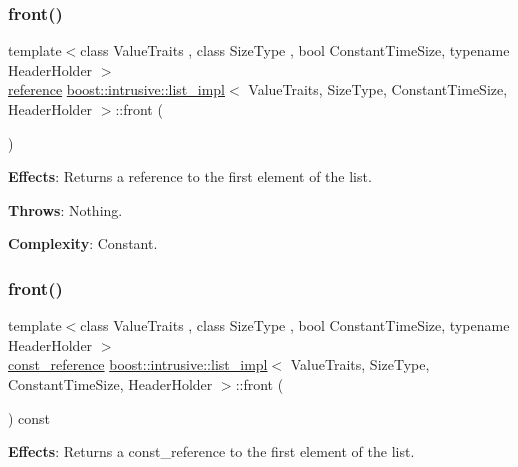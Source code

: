\subsubsection{\texorpdfstring{front()}{front()}\hspace{0.1cm}{\footnotesize\ttfamily [1/2]}}
{\footnotesize\ttfamily template$<$class Value\+Traits , class Size\+Type , bool Constant\+Time\+Size, typename Header\+Holder $>$ \\
\hyperlink{classboost_1_1intrusive_1_1list__impl_a881763b587dbe7c0237a552a9e89755a}{reference} \hyperlink{classboost_1_1intrusive_1_1list__impl}{boost\+::intrusive\+::list\+\_\+impl}$<$ Value\+Traits, Size\+Type, Constant\+Time\+Size, Header\+Holder $>$\+::front (\begin{DoxyParamCaption}{ }\end{DoxyParamCaption})\hspace{0.3cm}{\ttfamily [inline]}}

{\bfseries Effects}\+: Returns a reference to the first element of the list.

{\bfseries Throws}\+: Nothing.

{\bfseries Complexity}\+: Constant. \mbox{\label{classboost_1_1intrusive_1_1list__impl_a51eb323fe6d3cc6c590886a7514dbb27}} 
\subsubsection{\texorpdfstring{front()}{front()}\hspace{0.1cm}{\footnotesize\ttfamily [2/2]}}
{\footnotesize\ttfamily template$<$class Value\+Traits , class Size\+Type , bool Constant\+Time\+Size, typename Header\+Holder $>$ \\
\hyperlink{classboost_1_1intrusive_1_1list__impl_a3d37629151c76fb8389ac3ba3b359201}{const\+\_\+reference} \hyperlink{classboost_1_1intrusive_1_1list__impl}{boost\+::intrusive\+::list\+\_\+impl}$<$ Value\+Traits, Size\+Type, Constant\+Time\+Size, Header\+Holder $>$\+::front (\begin{DoxyParamCaption}{ }\end{DoxyParamCaption}) const\hspace{0.3cm}{\ttfamily [inline]}}

{\bfseries Effects}\+: Returns a const\+\_\+reference to the first element of the list.

